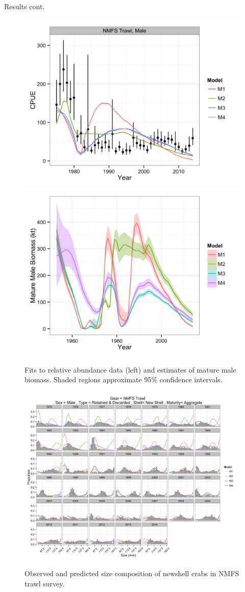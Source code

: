 \documentclass[final]{beamer} %
\begin{document}
\begin{frame}{}
\begin{columns}[t]
\begin{column}{.3\linewidth}
\begin{block}{\large Results cont.}
          \begin{figure}
          \includegraphics[width=0.5\linewidth]{figCPUE.png}
          \includegraphics[width=0.5\linewidth]{figMMB.png}\\
          \caption{Fits to relative abundance data (left) and estimates of 
          mature male biomass. Shaded regions approximate 95\% confidence intervals.}
          \label{figCPUE_MMB}
          \end{figure}

          \begin{figure}
          \includegraphics[width=\linewidth]{figSizeComps.png}\\
          \caption{Observed and predicted size composition of newshell crabs in NMFS trawl survey.}
          \label{figSizeComps}
          \end{figure}


\end{block}
\end{column}
\end{columns}
\end{frame}
\end{document}
